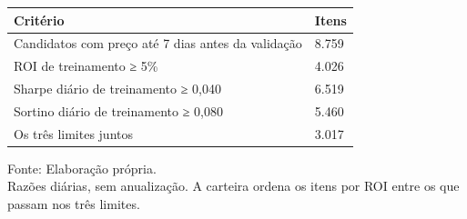 \begingroup
\setlength{}
\setlength{}
\fontsize{12.0pt}{14.4pt}\selectfont

\setlength{\LTpost}{0mm}
\begin{longtable}{@{\extracolsep{\fill}}ll}

\toprule
\textbf{Critério} & \textbf{Itens} \\ 
\midrule\addlinespace[2.5pt]
Candidatos com preço até 7 dias antes da validação & 8.759 \\
ROI de treinamento ≥ 5\% & 4.026 \\
Sharpe diário de treinamento ≥ 0,040 & 6.519 \\
Sortino diário de treinamento ≥ 0,080 & 5.460 \\
Os três limites juntos & 3.017 \\
\bottomrule
\end{longtable}
\begin{minipage}{\linewidth}
Fonte: Elaboração própria.\\
Razões diárias, sem anualização. A carteira ordena os itens por ROI entre os que passam nos três limites.\\
\end{minipage}
\endgroup
